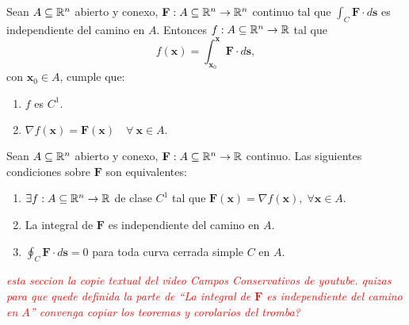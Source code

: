 \begin{theorem}
    Sean $A\subseteq\mathbb{R}^n$ abierto y conexo, $\mathbf{F}:A\subseteq\mathbb{R}^n\to\mathbb{R}^n$ continuo tal que $\int_C \mathbf{F}\cdot d\mathbf{s}$ es independiente del camino en $A$. Entonces $f:A\subseteq\mathbb{R}^n\to\mathbb{R}$ tal que
    $$f(\mathbf{x})=\int_{\mathbf{x}_0}^{\mathbf{x}}\mathbf{F}\cdot d\mathbf{s},$$
    con $\mathbf{x}_0\in A$, cumple que: 
    \begin{enumerate}
        \item $f$ es $C^1$.
        \item $\nabla f(\mathbf{x})=\mathbf{F}(\mathbf{x})\quad\forall\:\mathbf{x}\in A.$\final
    \end{enumerate}
\end{theorem}

\begin{theorem}
    Sean $A\subseteq\mathbb{R}^n$ abierto y conexo, $\mathbf{F}:A\subseteq\mathbb{R}^n\to\mathbb{R}$ continuo. Las siguientes condiciones sobre $\mathbf{F}$ son equivalentes:
    \begin{enumerate}
        \item $\exists f:A\subseteq\mathbb{R}^n\to\mathbb{R}$ de clase $C^1$ tal que $\mathbf{F}(\mathbf{x})=\nabla f(\mathbf{x}),\;\forall\mathbf{x}\in A.$ 
        \item La integral de $\mathbf{F}$ es independiente del camino en $A$.
        \item $\oint_C\mathbf{F}\cdot d\mathbf{s}=0$ para toda curva cerrada simple $C$ en $A$.\final
    \end{enumerate}
\end{theorem}

\textcolor{red}{\textit{esta seccion la copie textual del video Campos Conservativos de youtube. quizas para que quede definida la parte de ``La integral de $\mathbf{F}$ es independiente del camino en $A$'' convenga copiar los teoremas y corolarios del tromba?}}